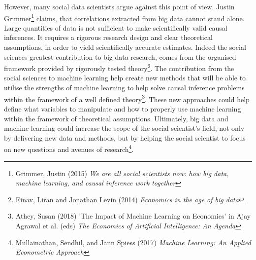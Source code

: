 \documentclass[12pt,a4paper]{article}
\begin{document}
However, many social data scientists argue against this point of view. Justin Grimmer\footnote{Grimmer, Justin (2015) \textit{We are all social scientists now: how big data, machine learning, and causal inference work together}} claims, that correlations extracted from big data cannot stand alone. Large quantities of data is not sufficient to make scientifically valid causal inferences. It requires a rigorous research design and clear theoretical assumptions, in order to yield scientifically accurate estimates. Indeed the social sciences greatest contribution to big data research, comes from the organised framework provided by rigorously tested theory\footnote{Einav, Liran and Jonathan Levin (2014) \textit{Economics in the age of big data}}.\newline
The contribution from the social sciences to machine learning help create new methods that will be able to utilise the strengths of machine learning to help solve causal inference problems within the framework of a well defined theory\footnote{Athey, Susan (2018) 'The Impact of Machine Learning on Economics' in Ajay Agrawal et al. (eds) \textit{The Economics of Artificial Intelligence: An Agenda}}. These new approaches could help define what variables to manipulate and how to properly use machine learning within the framework of theoretical assumptions. Ultimately, big data and machine learning could increase the scope of the social scientist's field, not only by delivering new data and methods, but by helping the social scientist to focus on new questions and avenues of research\footnote{Mullainathan, Sendhil, and Jann Spiess (2017) \textit{Machine Learning: An Applied Econometric Approach}}.
\end{document}
